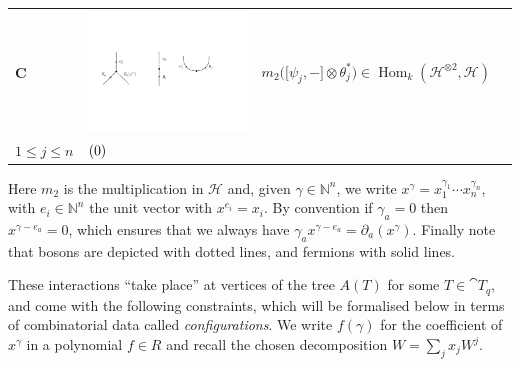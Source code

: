 \documentclass[english,letter paper,12pt,leqno]{article}
\newcommand{\tagarray}{\mbox{}\refstepcounter{equation}$(\theequation)$}
\theoremstyle{example}
\numberwithin{equation}{section}
\def\Hom{\operatorname{Hom}}
\begin{document}
\begin{center}
\begin{tabular}{ >{\centering}m{1cm} >{\centering}m{4cm} >{\centering}m{8cm} >{\centering}m{1cm}}
\textbf{C}
&
\includegraphics[scale=0.4]{dia4}
&
$m_2 \big( \big[\psi_j,-\big] \otimes \theta_j^* \big) \in \Hom_k( \mathscr{H}^{\otimes 2}, \mathscr{H} )$\\
\vspace{0.5cm}
$1 \le j \le n$
&
\tagarray{\label{interaction_3}}
\end{tabular}
\end{center}
Here $m_2$ is the multiplication in $\mathscr{H}$ and, given $\gamma \in \mathbb{N}^n$, we write $x^\gamma = x_1^{\gamma_1} \cdots x_n^{\gamma_n}$, with $e_i \in \mathbb{N}^n$ the unit vector with $x^{e_i} = x_i$. By convention if $\gamma_a = 0$ then $x^{\gamma - e_a} = 0$, which ensures that we always have $\gamma_a x^{\gamma - e_a} = \partial_a(x^\gamma)$. Finally note that bosons are depicted with dotted lines, and fermions with solid lines.

These interactions ``take place'' at vertices of the tree $A(T)$ for some $T \in \cat{T}_q$, and come with the following constraints, which will be formalised below in terms of combinatorial data called \emph{configurations}. We write $f(\gamma)$ for the coefficient of $x^\gamma$ in a polynomial $f \in R$ and recall the chosen decomposition $W = \sum_j x_j W^j$. 
\end{document}
